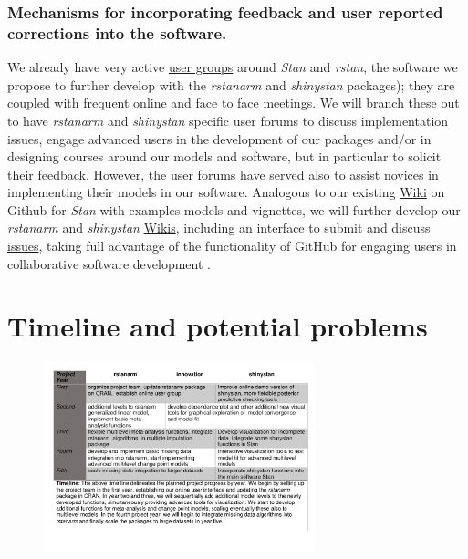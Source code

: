 \documentclass[11pt,notitlepage]{article}
\begin{document}
\subsubsection*{Mechanisms for incorporating feedback and user reported corrections into the software.}



We already have very active \href{https://groups.google.com/forum/#!forum/stan-users} {user groups} around \textit{Stan} and \textit{rstan}, the software we propose to further develop with the \textit{rstanarm} and \textit{shinystan} packages); they are coupled with frequent online and face to face \href{http://www.meetup.com/bda-group/}{meetings}. We will branch these out to have \textit{rstanarm} and \textit{shinystan} specific user forums to discuss implementation issues, engage advanced users in the development of our packages and/or in designing courses around our models and software, but in particular to solicit their feedback. However, the user forums have served also to assist novices in implementing their models in our software.
Analogous to our existing \href{https://github.com/stan-dev/example-models/wiki}{Wiki} on Github for \textit{Stan} with examples models and vignettes, we will further develop our \textit{rstanarm} and \textit{shinystan} \href{https://github.com/stan-dev/rstanarm/wiki}{Wikis}, including an interface to submit and discuss \href{https://github.com/stan-dev/rstanarm/issues}{issues}, taking full advantage of the functionality of GitHub for engaging users in collaborative software development \cite{loeliger2012version}. 

\section*{Timeline and potential problems}

\begin{figure} %
    \centering
 \vspace{-30pts}
\includegraphics[width=0.7\textwidth]{Figures/Timeline.pdf}
 \vspace{-60pts}
\end{figure}
\end{document}
